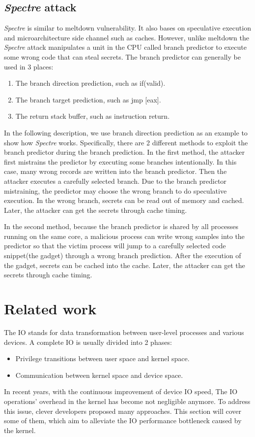 \subsection{\emph{Spectre} attack}

\emph{Spectre}\cite{4} is similar to meltdown vulnerability. It also bases on speculative 
execution and microarchitecture side channel such as caches. However, unlike meltdown the 
\emph{Spectre} attack manipulates a unit in the CPU called branch predictor to execute some wrong 
code that can steal secrets.  The branch predictor can generally be used in 3 places\cite{5}:



\begin{enumerate}
  \item The branch direction prediction,  such as if(valid).
  \item The branch target prediction, such as jmp [eax].
  \item The return stack buffer, such as instruction return.
\end{enumerate}
In the following description, we use branch direction prediction as an example to show 
how \emph{Spectre} works.  Specifically, there are 2 different methods to exploit the branch 
predictor during the branch prediction.  In the first method, the attacker first mistrains 
the predictor by executing some branches intentionally.  In this case, many wrong records 
are written into the branch predictor. Then the attacker executes a carefully selected branch. 
Due to the branch predictor mistraining, the predictor may choose the wrong branch to do 
speculative execution.  In the wrong branch, secrets can be read out of memory and cached. 
Later, the attacker can get the secrets through cache timing\cite{11}.

In the second method, 
because the branch predictor is shared by all processes running on the same core, 
a malicious process can write wrong samples into the predictor so that the victim process will 
jump to a carefully selected code snippet(the gadget) through a wrong branch prediction. 
After the execution of the gadget, secrets can be cached into the cache. Later, the attacker 
can get the secrets through cache timing.

\section{Related work}
The IO stands for data transformation between user-level processes 
and various devices. A complete IO is usually divided into 2 phases:
\begin{itemize}
  \item Privilege transitions between user space and kernel space.
  \item Communication between kernel space and device space.
\end{itemize}  
In recent years, with the continuous improvement of device IO speed, 
The IO operations' overhead in the kernel has become not negligible anymore. 
To address this issue, clever developers proposed many approaches. 
This section will cover some of them, which aim to alleviate the IO 
performance bottleneck caused by the kernel.

